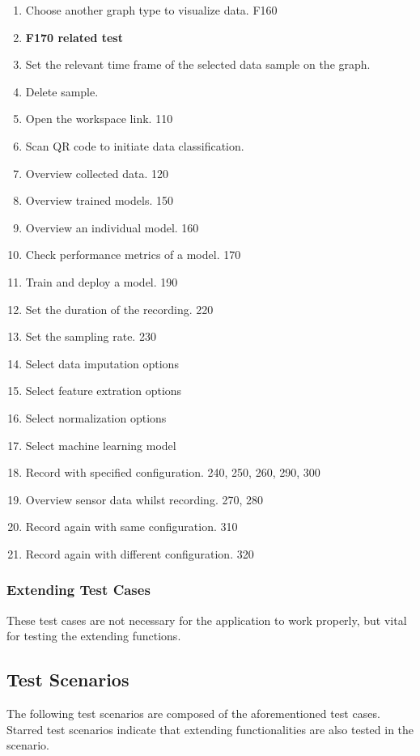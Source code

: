 \begin{enumerate}[{label = \textbf{/T{\protect\twodigits{\arabic{enumi}}}0/}, leftmargin = *}]
    \item Choose another graph type to visualize data. F160 %
    \item \textbf{F170 related test}
    \item Set the relevant time frame of the selected data sample on the graph. 
    \item Delete sample. 
    \item Open the workspace link. 110
    \item Scan QR code to initiate data classification. 
    \item Overview collected data. 120
    \item Overview trained models. 150
    \item Overview an individual model. 160
    \item Check performance metrics of a model. 170
    \item Train and deploy a model. 190
    \item Set the duration of the recording. 220
    \item Set the sampling rate. 230
    \item Select data imputation options
    \item Select feature extration options
    \item Select normalization options
    \item Select machine learning model
    \item Record with specified configuration. 240, 250, 260, 290, 300
    \item Overview sensor data whilst recording. 270, 280
    \item Record again with same configuration. 310
    \item Record again with different configuration. 320
\end{enumerate}
\subsubsection{Extending Test Cases}
These test cases are not necessary for the application to work properly, but vital for testing the extending functions. 
\subsection{Test Scenarios}
The following test scenarios are composed of the aforementioned test cases. Starred test scenarios indicate that extending functionalities are also tested in the scenario.
